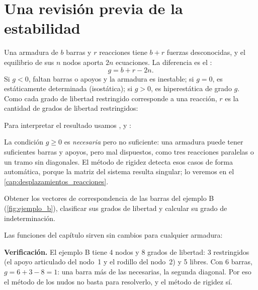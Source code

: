 \section{Una revisión previa de la estabilidad}\label{sec:estabilidad}

Una armadura de $b$ barras y $r$ reacciones tiene $b + r$ fuerzas
desconocidas, y el equilibrio de sus $n$ nodos aporta $2n$ ecuaciones. La
diferencia es el :
\[
  g = b + r - 2n.
\]
Si $g < 0$, faltan barras o apoyos y la armadura es inestable; si $g = 0$, es
estáticamente determinada (isostática); si $g > 0$, es hiperestática de grado
$g$. Como cada grado de libertad restringido corresponde a una reacción,
$r$ es la cantidad de grados de libertad restringidos:

Para interpretar el resultado usamos ,  y :

\begin{cuidado}
La condición $g \geq 0$ es \emph{necesaria} pero no suficiente: una armadura
puede tener suficientes barras y apoyos, pero mal dispuestos, como tres
reacciones paralelas o un tramo sin diagonales. El método de rigidez detecta
esos casos de forma automática, porque la matriz del sistema resulta singular;
lo veremos en el \cref{cap:desplazamientos_reacciones}.
\end{cuidado}

\begin{problemaresuelto}
Obtener los vectores de correspondencia de las barras del ejemplo B
(\cref{fig:ejemplo_b}), clasificar sus grados de libertad y calcular su
grado de indeterminación.

\solucion
Las funciones del capítulo sirven sin cambios para cualquier armadura:

\textbf{Verificación.} El ejemplo B tiene 4 nodos y 8 grados de libertad: 3
restringidos (el apoyo articulado del nodo~1 y el rodillo del nodo~2) y 5
libres. Con 6 barras, $g = 6 + 3 - 8 = 1$: una barra más de las necesarias,
la segunda diagonal. Por eso el método de los nudos no basta para resolverlo,
y el método de rigidez sí.
\end{problemaresuelto}

\repasoyresumen

